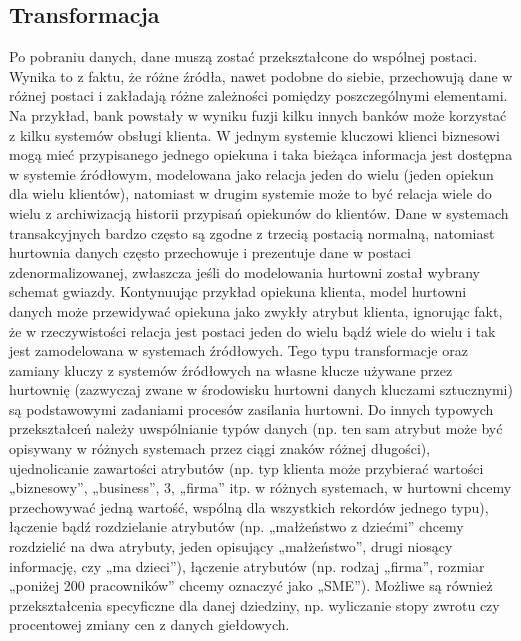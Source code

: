 \subsection{Transformacja}
Po pobraniu danych, dane muszą zostać przekształcone do wspólnej postaci.
Wynika to z faktu, że różne źródła, nawet podobne do siebie,
 przechowują dane w różnej postaci i zakładają różne zależności pomiędzy poszczególnymi elementami. 
Na przykład, bank powstały w wyniku fuzji kilku innych banków może korzystać z kilku systemów obsługi klienta. 
W jednym systemie kluczowi klienci biznesowi mogą mieć przypisanego jednego opiekuna
 i taka bieżąca informacja jest dostępna w systemie źródłowym,
 modelowana jako relacja jeden do wielu (jeden opiekun dla wielu klientów), 
 natomiast w drugim systemie może to być relacja wiele do wielu z archiwizacją historii przypisań opiekunów do klientów.
Dane w systemach transakcyjnych bardzo często są zgodne z trzecią postacią normalną,
 natomiast hurtownia danych często przechowuje i prezentuje dane w postaci zdenormalizowanej,
 zwłaszcza jeśli do modelowania hurtowni został wybrany schemat gwiazdy. 
Kontynuując przykład opiekuna klienta, model hurtowni danych może przewidywać opiekuna jako zwykły atrybut klienta,
 ignorując fakt, że w rzeczywistości relacja jest postaci jeden do wielu bądź wiele do wielu i tak jest zamodelowana w systemach źródłowych. 
Tego typu transformacje oraz zamiany kluczy z systemów źródłowych na własne klucze używane przez hurtownię 
(zazwyczaj zwane w środowisku hurtowni danych kluczami sztucznymi) są podstawowymi zadaniami procesów zasilania hurtowni.
Do innych typowych przekształceń należy uwspólnianie typów danych 
 (np. ten sam atrybut może być opisywany w różnych systemach przez ciągi znaków różnej długości),
 ujednolicanie zawartości atrybutów 
(np. typ klienta może przybierać wartości „biznesowy”, „business”, 3, „firma” itp. w różnych systemach,
 w hurtowni chcemy przechowywać jedną wartość, wspólną dla wszystkich rekordów jednego typu),
 łączenie bądź rozdzielanie atrybutów (np. „małżeństwo z dziećmi” chcemy rozdzielić na dwa atrybuty,
 jeden opisujący „małżeństwo”, drugi niosący informację, czy „ma dzieci”),
 łączenie atrybutów (np. rodzaj „firma”, rozmiar „poniżej 200 pracowników” chcemy oznaczyć jako „SME”).
 Możliwe są również przekształcenia specyficzne dla danej dziedziny,
 np. wyliczanie stopy zwrotu czy procentowej zmiany cen z danych giełdowych.
